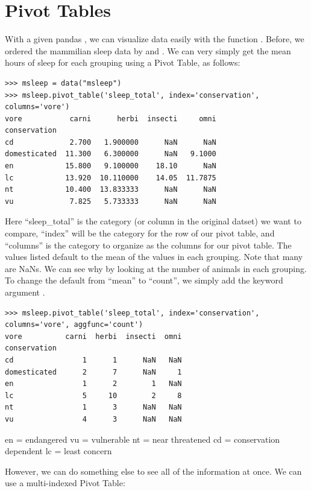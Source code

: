 \section*{Pivot Tables}
With a given pandas , we can visualize data easily with the function . Before, we ordered the mammilian sleep data by  and .  We can very simply get the mean hours of sleep for each grouping using a Pivot Table, as follows:

\begin{lstlisting}
>>> msleep = data("msleep")
>>> msleep.pivot_table('sleep_total', index='conservation', columns='vore')
vore           carni      herbi  insecti     omni
conservation                                     
cd             2.700   1.900000      NaN      NaN
domesticated  11.300   6.300000      NaN   9.1000
en            15.800   9.100000    18.10      NaN
lc            13.920  10.110000    14.05  11.7875
nt            10.400  13.833333      NaN      NaN
vu             7.825   5.733333      NaN      NaN
\end{lstlisting}

Here ``sleep\_total'' is the category (or column in the original datset) we want to compare, ``index'' will be the category for the row of our pivot table, and ``columns'' is the category to organize as the columns for our pivot table.  The values listed default to the mean of the values in each grouping.  Note that many are NaNs.  We can see why by looking at the number of animals in each grouping.  To change the default from ``mean'' to ``count'', we simply add the keyword argument .

\begin{lstlisting}
>>> msleep.pivot_table('sleep_total', index='conservation', columns='vore', aggfunc='count')
vore          carni  herbi  insecti  omni
conservation                             
cd                1      1      NaN   NaN
domesticated      2      7      NaN     1
en                1      2        1   NaN
lc                5     10        2     8
nt                1      3      NaN   NaN
vu                4      3      NaN   NaN
\end{lstlisting}

en = endangered
vu = vulnerable
nt = near threatened
cd = conservation dependent
lc = least concern

However, we can do something else to see all of the information at once.  We can use a multi-indexed Pivot Table:











